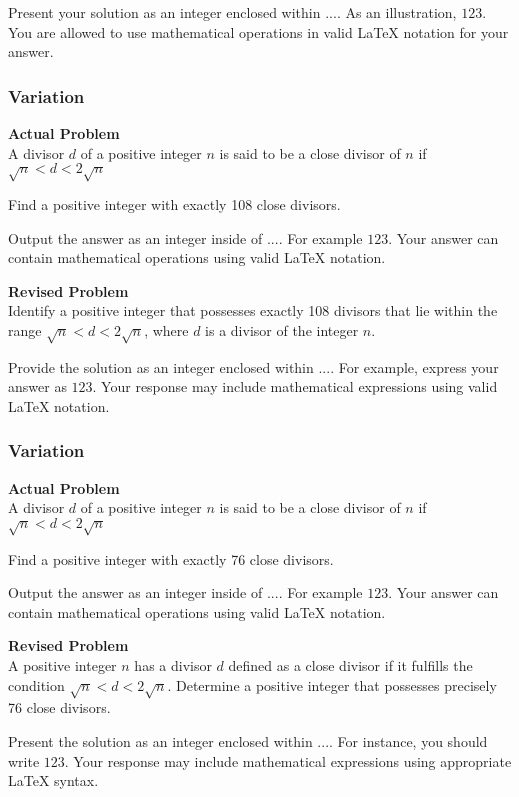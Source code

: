 Present your solution as an integer enclosed within \(\boxed{...}\). As an illustration, \(\boxed{123}\).
You are allowed to use mathematical operations in valid LaTeX notation for your answer.

\subsubsection{Variation}
\textbf{Actual Problem}\\
A divisor $d$ of a positive integer $n$ is said to be a close divisor of $n$ if $\sqrt{n} < d < 2\sqrt{n}$

Find a positive integer with exactly 108 close divisors.

Output the answer as an integer inside of $\boxed{...}$. For example $\boxed{123}$.
Your answer can contain mathematical operations using valid LaTeX notation.

\textbf{Revised Problem}\\
Identify a positive integer that possesses exactly 108 divisors that lie within the range $\sqrt{n} < d < 2\sqrt{n}$, where $d$ is a divisor of the integer $n$.

Provide the solution as an integer enclosed within $\boxed{...}$. For example, express your answer as $\boxed{123}$. Your response may include mathematical expressions using valid LaTeX notation.

\subsubsection{Variation}
\textbf{Actual Problem}\\
A divisor $d$ of a positive integer $n$ is said to be a close divisor of $n$ if $\sqrt{n} < d < 2\sqrt{n}$

Find a positive integer with exactly 76 close divisors.

Output the answer as an integer inside of $\boxed{...}$. For example $\boxed{123}$.
Your answer can contain mathematical operations using valid LaTeX notation.

\textbf{Revised Problem}\\
A positive integer $n$ has a divisor $d$ defined as a close divisor if it fulfills the condition $\sqrt{n} < d < 2\sqrt{n}$. Determine a positive integer that possesses precisely 76 close divisors.

Present the solution as an integer enclosed within $\boxed{...}$. For instance, you should write $\boxed{123}$. Your response may include mathematical expressions using appropriate LaTeX syntax.

